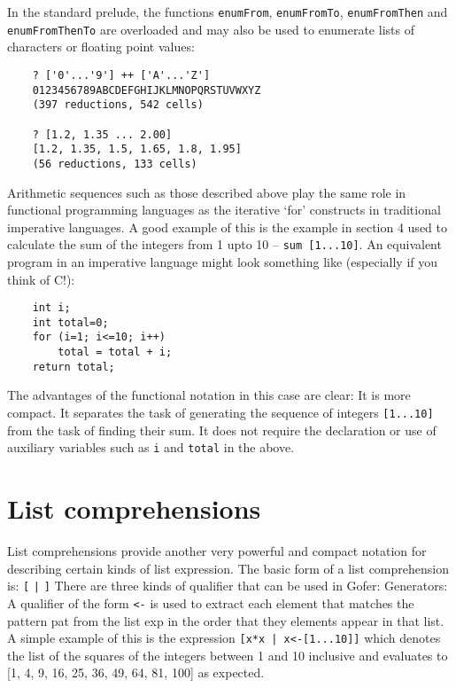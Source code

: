 \EQ
In  the  standard  prelude,   the   functions   \verb"enumFrom",
\verb"enumFromTo",
\verb"enumFromThen" and \verb"enumFromThenTo" 
are overloaded and may also be used  to
enumerate lists of characters or floating point values:
\begin{verbatim}
    ? ['0'...'9'] ++ ['A'...'Z']
    0123456789ABCDEFGHIJKLMNOPQRSTUVWXYZ
    (397 reductions, 542 cells)

    ? [1.2, 1.35 ... 2.00]
    [1.2, 1.35, 1.5, 1.65, 1.8, 1.95]
    (56 reductions, 133 cells)
\end{verbatim}
Arithmetic sequences such as those described above play the  same  role
in functional programming languages as the iterative  `for'  constructs
in traditional imperative languages.  A good example  of  this  is  the
example in section 4 used to calculate the sum of the integers  from  1
upto 10 -- \verb"sum [1...10]".   An  equivalent  program  in  an  imperative
language might look something like (especially if you think of C!):
\begin{verbatim}
    int i;
    int total=0;
    for (i=1; i<=10; i++)
        total = total + i;
    return total;
\end{verbatim}
The advantages of the functional notation in this case are clear:
\BSI
\IT  It is more compact.
\IT  It separates the task of  generating  the  sequence  of  integers
      \verb"[1...10]" from the task of finding their sum.
\IT  It does not require the declaration or use of auxiliary variables
      such as \verb"i" and \verb"total" in the above.
\ESI


\section{List comprehensions}
List comprehensions provide another very powerful and compact  notation
for describing certain kinds of list expression.  The basic form  of  a
list comprehension is:
\BQ
    \verb"["  \verb"|"  \verb"]"
\EQ
There are three kinds of qualifier that can be used in Gofer:
\BI
\IT  Generators: A qualifier of the form  \verb"<-" 
     is  used  to  extract
     each element that matches the pattern pat from the list exp in the
     order that they elements appear in that list.  A simple example of
     this is the expression \verb"[x*x | x<-[1...10]]" which denotes  the  list
     of the squares of the integers between  1  and  10  inclusive  and
     evaluates to [1, 4, 9, 16, 25, 36, 49, 64, 81, 100] as expected.

